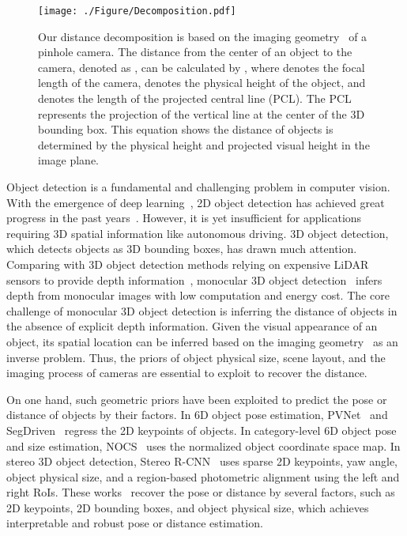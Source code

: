 \documentclass[10pt,twocolumn,letterpaper]{article}
\begin{document}
\begin{figure}
\centering
\texttt{[image: ./Figure/Decomposition.pdf]}
\caption{Our distance decomposition is based on the imaging geometry~\cite{Hartley2000} of a pinhole camera. The distance from the center of an object to the camera, denoted as , can be calculated by , where  denotes the focal length of the camera,  denotes the physical height of the object, and  denotes the length of the projected central line (PCL). The PCL represents the projection of the vertical line at the center of the 3D bounding box. This equation shows the distance of objects is determined by the physical height and projected visual height in the image plane.}
\label{fig:Decomposition}
\end{figure}

Object detection is a fundamental and challenging problem in computer vision. With the emergence of deep learning~\cite{DBLP:journals/corr/SimonyanZ14a,DBLP:conf/cvpr/HeZRS16}, 2D object detection has achieved great progress in the past years~\cite{DBLP:conf/cvpr/GirshickDDM14,DBLP:conf/iccv/Girshick15,DBLP:conf/nips/RenHGS15,DBLP:conf/eccv/LiuAESRFB16,DBLP:conf/iccv/LinGGHD17,DBLP:conf/cvpr/LinDGHHB17}. However, it is yet insufficient for applications requiring 3D spatial information like autonomous driving. 3D object detection, which detects objects as 3D bounding boxes, has drawn much attention. Comparing with 3D object detection methods relying on expensive LiDAR sensors to provide depth information~\cite{DBLP:conf/cvpr/YangLU18,DBLP:conf/cvpr/ShiWL19,DBLP:conf/cvpr/ZhouT18,DBLP:conf/cvpr/LangVCZYB19}, monocular 3D object detection~\cite{DBLP:conf/cvpr/ChenKZMFU16,DBLP:conf/bmvc/RoddickKC19} infers depth from monocular images with low computation and energy cost. The core challenge of monocular 3D object detection is inferring the distance of objects in the absence of explicit depth information. Given the visual appearance of an object, its spatial location can be inferred based on the imaging geometry~\cite{Hartley2000} as an inverse problem. Thus, the priors of object physical size, scene layout, and the imaging process of cameras are essential to exploit to recover the distance.


On one hand, such geometric priors have been exploited to predict the pose or distance of objects by their factors. In 6D object pose estimation, PVNet~\cite{DBLP:conf/cvpr/PengLHZB19} and SegDriven~\cite{DBLP:conf/cvpr/HuHFS19} regress the 2D keypoints of objects. In category-level
6D object pose and size estimation, NOCS~\cite{DBLP:conf/cvpr/Wang0HVSG19} uses the normalized object coordinate space map. In stereo 3D object detection, Stereo R-CNN~\cite{DBLP:conf/cvpr/0001CS19} uses sparse 2D keypoints, yaw angle, object physical size, and a region-based photometric alignment using the left and right RoIs. These works~\cite{DBLP:conf/cvpr/PengLHZB19,DBLP:conf/cvpr/HuHFS19,DBLP:conf/cvpr/0001CS19,DBLP:conf/cvpr/Wang0HVSG19} recover the pose or distance by several factors, such as 2D keypoints, 2D bounding boxes, and object physical size, which achieves interpretable and robust pose or distance estimation. 
\end{document}
